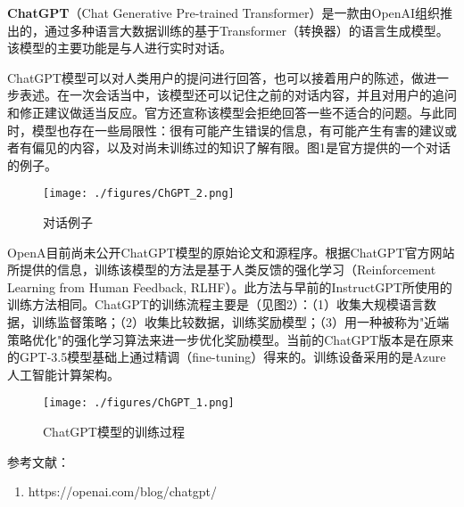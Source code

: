
\textbf{ChatGPT}（Chat Generative Pre-trained Transformer）是一款由OpenAI组织推出的，通过多种语言大数据训练的基于Transformer（转换器）的语言生成模型。该模型的主要功能是与人进行实时对话。

ChatGPT模型可以对人类用户的提问进行回答，也可以接着用户的陈述，做进一步表述。在一次会话当中，该模型还可以记住之前的对话内容，并且对用户的追问和修正建议做适当反应。官方还宣称该模型会拒绝回答一些不适合的问题。与此同时，模型也存在一些局限性：很有可能产生错误的信息，有可能产生有害的建议或者有偏见的内容，以及对尚未训练过的知识了解有限。图1是官方提供的一个对话的例子。

\begin{figure}[ht]
\centering
\texttt{[image: ./figures/ChGPT\_2.png]}
\caption{对话例子} \label{ChGPT_fig2}
\end{figure}

OpenA目前尚未公开ChatGPT模型的原始论文和源程序。根据ChatGPT官方网站所提供的信息，训练该模型的方法是基于人类反馈的强化学习（Reinforcement Learning from Human Feedback, RLHF）。此方法与早前的InstructGPT所使用的训练方法相同。ChatGPT的训练流程主要是（见图2）：（1）收集大规模语言数据，训练监督策略；（2）收集比较数据，训练奖励模型；（3）用一种被称为"近端策略优化"的强化学习算法来进一步优化奖励模型。当前的ChatGPT版本是在原来的GPT-3.5模型基础上通过精调（fine-tuning）得来的。训练设备采用的是Azure人工智能计算架构。
\begin{figure}[ht]
\centering
\texttt{[image: ./figures/ChGPT\_1.png]}
\caption{ChatGPT模型的训练过程} \label{ChGPT_fig1}
\end{figure}




参考文献：
\begin{enumerate}
\item https://openai.com/blog/chatgpt/
\end{enumerate}